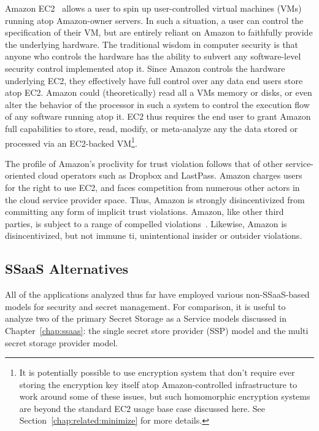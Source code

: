 Amazon EC2~\cite{amazon-ec2} allows a user to spin up user-controlled
virtual machines (VMs) running atop Amazon-owner servers. In such a
situation, a user can control the specification of their VM, but are
entirely reliant on Amazon to faithfully provide the underlying
hardware. The traditional wisdom in computer security is that anyone
who controls the hardware has the ability to subvert any
software-level security control implemented atop it. Since Amazon
controls the hardware underlying EC2, they effectively have full
control over any data end users store atop EC2. Amazon could
(theoretically) read all a VMs memory or disks, or even alter the
behavior of the processor in such a system to control the execution
flow of any software running atop it. EC2 thus requires the end user
to grant Amazon full capabilities to store, read, modify, or
meta-analyze any the data stored or processed via an EC2-backed
VM\footnote{It is potentially possible to use encryption system that
  don't require ever storing the encryption key itself atop
  Amazon-controlled infrastructure to work around some of these
  issues, but such homomorphic encryption systems are beyond the
  standard EC2 usage base case discussed here. See
  Section~\ref{chap:related:minimize} for more details.}.

The profile of Amazon's proclivity for trust violation follows that of
other service-oriented cloud operators such as Dropbox and
LastPass. Amazon charges users for the right to use EC2, and faces
competition from numerous other actors in the cloud service provider
space. Thus, Amazon is strongly disincentivized from committing any
form of implicit trust violations. Amazon, like other third parties,
is subject to a range of compelled
violations~\cite{amazon-transparency}. Likewise, Amazon is
disincentivized, but not immune ti, unintentional insider or outsider
violations.

\subsection{SSaaS Alternatives}

All of the applications analyzed thus far have employed various
non-SSaaS-based models for security and secret management. For
comparison, it is useful to analyze two of the primary Secret Storage
as a Service models discussed in Chapter~\ref{chap:ssaas}: the single
secret store provider (SSP) model and the multi secret storage
provider model.

